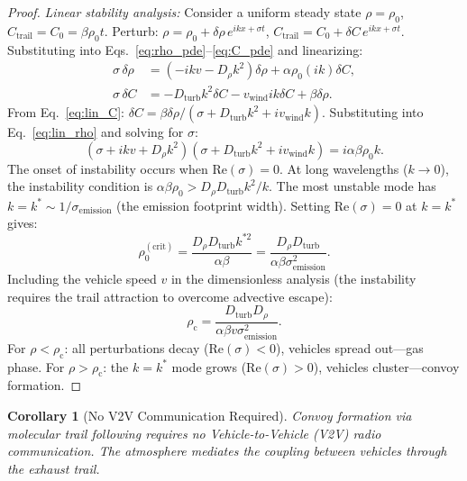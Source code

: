 \documentclass[11pt,twocolumn,a4paper]{article}
\theoremstyle{plain}
\newtheorem{corollary}[theorem]{Corollary}
\theoremstyle{definition}
\theoremstyle{remark}
\newcommand{\Dturb}{D_{\mathrm{turb}}}
\newcommand{\Ctrail}{C_{\mathrm{trail}}}
\newcommand{\rhoc}{\rho_{\mathrm{c}}}
\begin{document}
\begin{proof}
\emph{Linear stability analysis:} Consider a uniform steady state $\rho = \rho_0$, $\Ctrail = C_0 = \beta \rho_0 t$. Perturb: $\rho = \rho_0 + \delta\rho \, e^{ikx + \sigma t}$, $\Ctrail = C_0 + \delta C \, e^{ikx + \sigma t}$. Substituting into Eqs.~\eqref{eq:rho_pde}--\eqref{eq:C_pde} and linearizing:
\begin{align}
\sigma \, \delta\rho &= (-ikv - D_\rho k^2)\delta\rho + \alpha \rho_0 (ik)\delta C, \label{eq:lin_rho}\\
\sigma \, \delta C &= -\Dturb k^2 \delta C - v_{\mathrm{wind}} ik \delta C + \beta \delta\rho. \label{eq:lin_C}
\end{align}
From Eq.~\eqref{eq:lin_C}: $\delta C = \beta \delta\rho / (\sigma + \Dturb k^2 + iv_{\mathrm{wind}}k)$. Substituting into Eq.~\eqref{eq:lin_rho} and solving for $\sigma$:
\begin{equation}
(\sigma + ikv + D_\rho k^2)(\sigma + \Dturb k^2 + iv_{\mathrm{wind}}k) = i\alpha\beta\rho_0 k.
\label{eq:dispersion}
\end{equation}
The onset of instability occurs when $\mathrm{Re}(\sigma) = 0$. At long wavelengths ($k \to 0$), the instability condition is $\alpha\beta\rho_0 > D_\rho \Dturb k^2 / k$. The most unstable mode has $k = k^* \sim 1/\sigma_{\mathrm{emission}}$ (the emission footprint width). Setting $\mathrm{Re}(\sigma) = 0$ at $k = k^*$ gives:
\begin{equation}
\rho_0^{(\mathrm{crit})} = \frac{D_\rho \Dturb k^{*2}}{\alpha\beta} = \frac{D_\rho \Dturb}{\alpha\beta\sigma_{\mathrm{emission}}^2}.
\end{equation}
Including the vehicle speed $v$ in the dimensionless analysis (the instability requires the trail attraction to overcome advective escape):
\begin{equation}
\rhoc = \frac{\Dturb D_\rho}{\alpha\beta v \sigma_{\mathrm{emission}}^2}.
\end{equation}
For $\rho < \rhoc$: all perturbations decay ($\mathrm{Re}(\sigma) < 0$), vehicles spread out---gas phase.
For $\rho > \rhoc$: the $k = k^*$ mode grows ($\mathrm{Re}(\sigma) > 0$), vehicles cluster---convoy formation.
\end{proof}

\begin{corollary}[No V2V Communication Required]
\label{cor:no_v2v}
Convoy formation via molecular trail following requires no Vehicle-to-Vehicle (V2V) radio communication. The atmosphere mediates the coupling between vehicles through the exhaust trail.
\end{corollary}
\end{document}
